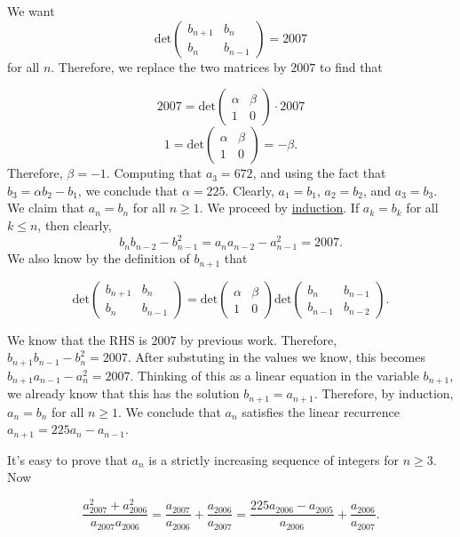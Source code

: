 \begin{enumerate}
 We want 
 \[\text{det}\left(\begin{array}{cc}b_{n+1}&b_n\\b_n&b_{n-1}\end{array}\right)=2007\] for all $n$. Therefore, we replace the two matrices by $2007$ to find that 

 
 \[2007=\text{det}\left(\begin{array}{cc}\alpha&\beta\\1&0\end{array}\right)\cdot 2007\]
 \[1=\text{det}\left(\begin{array}{cc}\alpha&\beta\\1&0\end{array}\right)=-\beta.\]Therefore, $\beta=-1$. Computing that $a_3=672$, and using the fact that $b_3=\alpha b_2-b_1$, we conclude that $\alpha=225$. Clearly, $a_1=b_1$, $a_2=b_2$, and $a_3=b_3$. We claim that $a_n=b_n$ for all $n\ge 1$. We proceed by \href{https://artofproblemsolving.com/wiki/index.php?title=Induction}{induction}. If $a_k=b_k$ for all $k\le n$, then clearly, 
 \[b_nb_{n-2}-b_{n-1}^2=a_na_{n-2}-a_{n-1}^2=2007.\] We also know by the definition of $b_{n+1}$ that

 
 \[\text{det}\left(\begin{array}{cc}b_{n+1}&b_n\\b_n&b_{n-1}\end{array}\right)=\text{det}\left(\begin{array}{cc}\alpha&\beta\\1&0\end{array}\right)\text{det}\left(\begin{array}{cc}b_{n}&b_{n-1}\\b_{n-1}&b_{n-2}\end{array}\right).\]

 We know that the RHS is $2007$ by previous work. Therefore, $b_{n+1}b_{n-1}-b_n^2=2007$. After substuting in the values we know, this becomes $b_{n+1}a_{n-1}-a_n^2=2007$.  Thinking of this as a linear equation in the variable $b_{n+1}$, we already know that this has the solution $b_{n+1}=a_{n+1}$. Therefore, by induction, $a_n=b_n$ for all $n\ge 1$. We conclude that $a_n$ satisfies the linear recurrence $a_{n+1}=225a_n-a_{n-1}$.

 It's easy to prove that $a_n$ is a strictly increasing sequence of integers for $n\ge 3$. Now 

 
 \[\frac{a_{2007}^2+a_{2006}^2}{a_{2007}a_{2006}}=\frac{a_{2007}}{a_{2006}}+\frac{a_{2006}}{a_{2007}}=\frac{225a_{2006}-a_{2005}}{a_{2006}}+\frac{a_{2006}}{a_{2007}}.\]


\end{enumerate}
